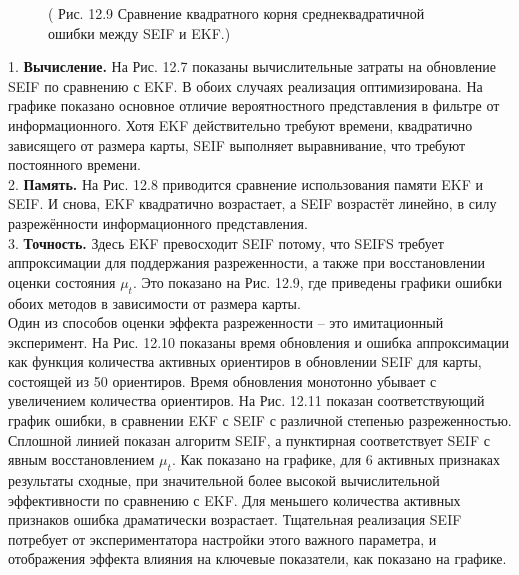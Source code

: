 \documentclass[10pt,a4paper]{article}
\begin{document}
\begin{figure}[H]
	\caption{ ( Рис. 12.9 Сравнение квадратного корня среднеквадратичной ошибки между SEIF и EKF.) }
	\label{fig:129orig}
\end{figure}

1.	\textbf{Вычисление.} На Рис. 12.7 показаны вычислительные затраты на обновление SEIF по сравнению с EKF. В обоих случаях реализация оптимизирована. На графике показано основное отличие вероятностного представления в фильтре от информационного. Хотя EKF действительно требуют времени, квадратично зависящего от размера карты, SEIF выполняет выравнивание, что требуют постоянного времени.\\

2.	\textbf{Память.} На Рис. 12.8 приводится сравнение использования памяти EKF и SEIF. И снова, EKF квадратично возрастает, а SEIF возрастёт линейно, в силу разрежённости информационного представления.\\

3.\textbf{	Точность.} Здесь EKF превосходит SEIF потому, что SEIFS требует аппроксимации для поддержания разреженности, а также при восстановлении оценки состояния $\mu_t$. Это показано на Рис. 12.9, где приведены графики ошибки обоих методов в зависимости от размера карты.\\

Один из способов оценки эффекта разреженности – это имитационный эксперимент. На Рис. 12.10 показаны время обновления и ошибка аппроксимации как функция количества активных ориентиров в обновлении SEIF для карты, состоящей из 50 ориентиров. Время обновления монотонно убывает с увеличением количества ориентиров. На Рис. 12.11 показан соответствующий график ошибки, в сравнении EKF с SEIF с различной степенью разреженностью. Сплошной линией показан алгоритм SEIF, а пунктирная соответствует SEIF с явным восстановлением $\mu_t$. Как показано на графике, для 6 активных признаках результаты сходные, при значительной более высокой вычислительной эффективности по сравнению с EKF. Для меньшего количества активных признаков ошибка драматически возрастает. Тщательная реализация SEIF потребует от экспериментатора настройки этого важного параметра, и отображения эффекта влияния на ключевые показатели, как показано на графике. 
\end{document}
